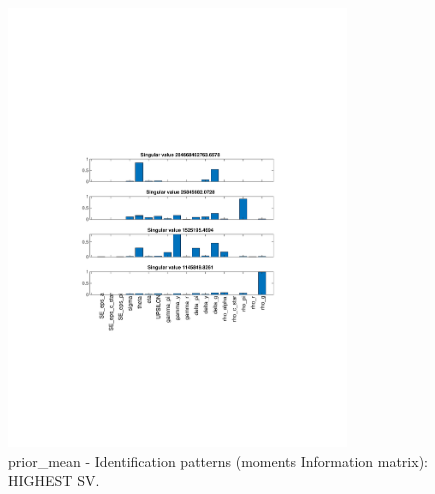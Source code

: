 
\begin{figure}[H]
\centering 
\includegraphics[width=0.8\textwidth]{nash/identification/nash_ident_pattern_prior_mean_2}
\caption{prior_mean - Identification patterns (moments Information matrix): HIGHEST SV.}\label{Fig:ident_pattern:prior_mean:2}
\end{figure}

